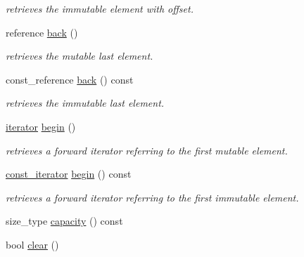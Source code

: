 \begin{DoxyCompactItemize}
\begin{DoxyCompactList}\small\item\em retrieves the immutable element with offset. \end{DoxyCompactList}\item 
\hypertarget{classhryky_1_1_vector_a203f7e037d3d9a132eef014c542f19ee}{reference \hyperlink{classhryky_1_1_vector_a203f7e037d3d9a132eef014c542f19ee}{back} ()}\label{classhryky_1_1_vector_a203f7e037d3d9a132eef014c542f19ee}

\begin{DoxyCompactList}\small\item\em retrieves the mutable last element. \end{DoxyCompactList}\item 
\hypertarget{classhryky_1_1_vector_ac68715f9ad0923f9489aa0272f21b170}{const\-\_\-reference \hyperlink{classhryky_1_1_vector_ac68715f9ad0923f9489aa0272f21b170}{back} () const }\label{classhryky_1_1_vector_ac68715f9ad0923f9489aa0272f21b170}

\begin{DoxyCompactList}\small\item\em retrieves the immutable last element. \end{DoxyCompactList}\item 
\hypertarget{classhryky_1_1_vector_aa032aa9e48dce836e68434e6ad58f0f5}{\hyperlink{classhryky_1_1iterator_1_1random_1_1_mutable}{iterator} \hyperlink{classhryky_1_1_vector_aa032aa9e48dce836e68434e6ad58f0f5}{begin} ()}\label{classhryky_1_1_vector_aa032aa9e48dce836e68434e6ad58f0f5}

\begin{DoxyCompactList}\small\item\em retrieves a forward iterator referring to the first mutable element. \end{DoxyCompactList}\item 
\hypertarget{classhryky_1_1_vector_a244f7b781e42a20b70c04611b19db164}{\hyperlink{classhryky_1_1iterator_1_1random_1_1_immutable}{const\-\_\-iterator} \hyperlink{classhryky_1_1_vector_a244f7b781e42a20b70c04611b19db164}{begin} () const }\label{classhryky_1_1_vector_a244f7b781e42a20b70c04611b19db164}

\begin{DoxyCompactList}\small\item\em retrieves a forward iterator referring to the first immutable element. \end{DoxyCompactList}\item 
size\-\_\-type \hyperlink{classhryky_1_1_vector_a0865b1eec33d6dfe008eb7c24afd5f97}{capacity} () const 
\item 
\hypertarget{classhryky_1_1_vector_a674ecb00d223d91ba58bb45540be9983}{bool \hyperlink{classhryky_1_1_vector_a674ecb00d223d91ba58bb45540be9983}{clear} ()}\label{classhryky_1_1_vector_a674ecb00d223d91ba58bb45540be9983}


\end{DoxyCompactItemize}
